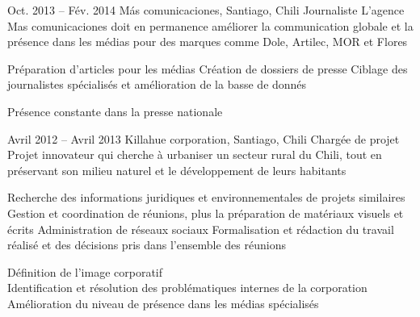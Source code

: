\documentclass[30pt, french]{tccv}
\begin{document}
\begin{upshape}
\begin{textblock}{13.3}
\begin{mdframed}
\begin{eventlist}
\setlength{\parskip}{0pt}    
\item{Oct. 2013 -- Fév. 2014 }     
  {Más comunicaciones, Santiago, Chili}     
  {Journaliste}
     \fontsize{9pt}{1em}\color{text}\bodyfontlight\upshape\selectfont
{} L’agence Mas comunicaciones doit en permanence améliorer la communication globale et la présence dans les médias
pour des marques comme Dole, Artilec, MOR et Flores\\

\setlength{\parskip}{-10pt}
\begin{itemize}
      \setlength\itemsep{-3pt} 
      \cvitem[\checkmark]  Préparation d'articles pour les médias                                            
      \cvitem[\checkmark]  Création de dossiers de presse                                                     
      \cvitem[\checkmark]  Ciblage des journalistes spécialisés et amélioration de la basse de donnés  
\end{itemize}       
 Présence constante dans la presse nationale
\vspace{0.5cm}




\setlength{\parskip}{0pt}
\item{Avril 2012 -- Avril 2013 }     
  {Killahue corporation, Santiago, Chili}     
  {Chargée de projet}
\fontsize{9pt}{1em}\color{text}\bodyfontlight\upshape\selectfont
{} Projet innovateur qui cherche à urbaniser un secteur rural du Chili, tout en préservant son milieu naturel et le développement de leurs habitants \\
     
\setlength{\parskip}{-10pt}
\begin{itemize}
      \setlength\itemsep{-3pt} 
      \cvitem[\checkmark] Recherche des informations juridiques et environnementales de projets similaires          
      \cvitem[\checkmark] Gestion et coordination de réunions, plus la préparation de matériaux visuels et écrits   
      \cvitem[\checkmark] Administration de réseaux sociaux                                                                    
      \cvitem[\checkmark] Formalisation et rédaction du travail réalisé et des décisions pris dans l’ensemble des réunions     
\end{itemize}      

  Définition de l’image corporatif \\
\makebox[1.4cm][l]{}            Identification et résolution des problématiques internes de la corporation \\
\makebox[1.4cm][l]{} 		Amélioration du niveau de présence dans les médias spécialisés \\



\end{eventlist}
\end{mdframed}
\end{textblock}
\end{upshape}
\end{document}
